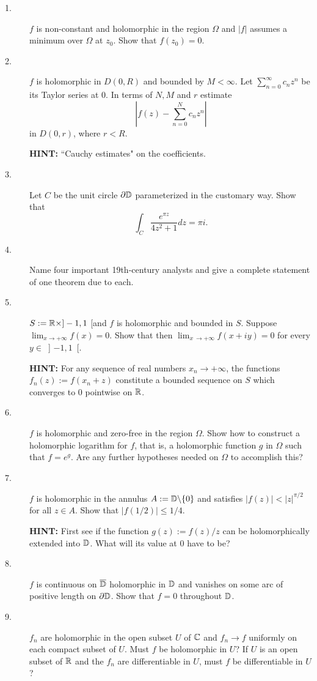 \documentclass{article}
\begin{document}
\begin{description}
\item[1.]
$f$ is non-constant and holomorphic in the region $\Omega$ and $|f|$
assumes a minimum over $\Omega$ at $z_0$. Show that $f(z_0) = 0$.

\item[2.]
$f$ is holomorphic in $D(0,R)$ and bounded by $M < \infty$. Let
$\sum^\infty_{n=0} c_nz^n$ be its Taylor series at 0. In terms of $N, M$ and
$r$ estimate
$$\left| f(z) - \sum^N_{n=0} c_n z^n \right|$$
in $D(0,r)$, where $r < R$.

{\bf HINT:} ``Cauchy estimates" on the coefficients.

\item[3.]
Let $C$ be the unit circle $\partial \Bbb D$ parameterized in the
customary way. Show that
$$\int_C \frac{e^{\pi z}}{4z^2 + 1} dz = \pi i.$$

\item[4.]
Name four important 19th-century analysts and give a complete statement of
one theorem due to each.

\item[5.]
$S := \Bbb R \times ] - 1, 1$ [and $f$ is holomorphic and bounded in $S$.
Suppose $\lim_{x \to +\infty} f(x) =0$. Show that then
$\lim_{x\ \to +\infty} f(x + iy) = 0$ for every $y \in$\ ] $-1, 1$\ [.

{\bf HINT:} For any sequence of real numbers $x_n \to + \infty$, the
functions $f_n (z) := f(x_n + z)$ constitute a bounded sequence on $S$
which converges to 0 pointwise on $\Bbb R$.

\item[6.]
$f$ is holomorphic and zero-free in the region $\Omega$. Show how to construct
a holomorphic logarithm for $f$, that is, a holomorphic function $g$ in
$\Omega$ such that $f = e^g$. Are any further hypotheses needed on
$\Omega$ to accomplish this?

\item[7.]
$f$ is holomorphic in the annulus $A := \Bbb D \backslash \{0\}$ and
satisfies $|f(z)| < |z|^{\pi /2}$ for all $z \in A$. Show that
$|f(1/2) | \leq 1/4$.

{\bf HINT:} First see if the function $g(z) := f(z)/z$ can be
holomorphically extended into $\Bbb D$. What will its value at 0 have to be?

\item[8.]
$f$ is continuous on $\overline{\Bbb D}$ holomorphic in $\Bbb D$ and vanishes
on some arc of positive length on $\partial \Bbb D$. Show that
$f=0$ throughout $\Bbb D$.

\item[9.]
$f_n$ are holomorphic in the open subset $U$ of $\Bbb C$ and $f_n \to f$
uniformly on each compact subset of $U$. Must $f$ be holomorphic in $U$?
If $U$ is an open subset of $\Bbb R$ and the $f_n$ are differentiable in $U$,
must $f$ be differentiable in $U$?






\end{description}    
\end{document}

